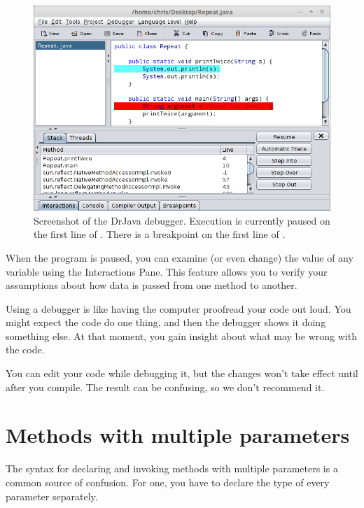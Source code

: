\begin{figure}[!h]
\includegraphics[width=\textwidth]{debugger.png}
\caption{Screenshot of the DrJava debugger.
Execution is currently paused on the first line of .
There is a breakpoint on the first line of .}
\end{figure}

When the program is paused, you can examine (or even change) the value of any variable using the Interactions Pane.
This feature allows you to verify your assumptions about how data is passed from one method to another.

Using a debugger is like having the computer proofread your code out loud.
You might expect the code do one thing, and then the debugger shows it doing something else.
At that moment, you gain insight about what may be wrong with the code.

You can edit your code while debugging it, but the changes won't take effect until after you compile.  The result can be confusing, so we don't recommend it.


\section{Methods with multiple parameters}
\label{time}


The syntax for declaring and invoking methods with multiple parameters is a common source of confusion.
For one, you have to declare the type of every parameter separately.

